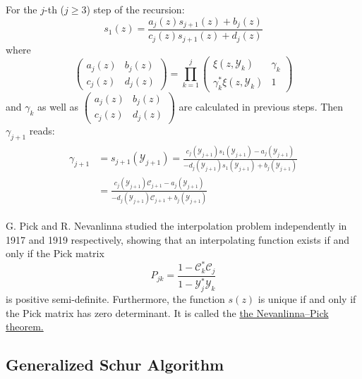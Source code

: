 \documentclass[
	preprint,%
	aps,
	prb,
	showpacs,	
	amsmath, amssymb]{revtex4-2}
\newcommand{\Y}{ {\mathcal{Y}} }
\newcommand{\C}{ {\mathcal{C}} }
\begin{document}
For the $j$-th ($j \geq 3$) step of the recursion:
\begin{equation}
	s_1(z) 
	= \frac{a_j(z) s_{j+1}(z) + b_j(z)}{c_j(z) s_{j+1}(z) + d_j(z)}
\end{equation}
where
\begin{equation}
	\left(
		\begin{matrix}
			a_j(z) & b_j(z) \\
			c_j(z) & d_j(z)
		\end{matrix}
	\right)
	= \prod_{k=1}^{j}
	\left(
		\begin{matrix}
			\xi(z, \Y_k)            & \gamma_k \\
			\gamma_k^* \xi(z, \Y_k) & 1
		\end{matrix}
	\right)
\end{equation}
and $\gamma_k$ as well as $	\left(
	\begin{matrix}
		a_j(z) & b_j(z) \\
		c_j(z) & d_j(z)
	\end{matrix}
\right)$ are calculated in previous steps. 
Then $\gamma_{j+1}$ reads:
\begin{align}
\begin{split}
	\gamma_{j+1} &= s_{j+1}(\Y_{j+1}) 
	= \frac{c_j(\Y_{j+1}) s_1(\Y_{j+1}) - a_j(\Y_{j+1})}
	{-d_j(\Y_{j+1}) s_1(\Y_{j+1}) + b_j(\Y_{j+1})} \\
	&= \frac{c_j(\Y_{j+1}) \C_{j+1} - a_j(\Y_{j+1})}
	{-d_j(\Y_{j+1}) \C_{j+1} + b_j(\Y_{j+1})}
\end{split}
\end{align}


G. Pick and R. Nevanlinna studied the interpolation problem 
independently in 1917\cite{Pick1917} and 1919\cite{nevanlinna1919uber} 
respectively, showing that an 
interpolating function exists if and only if the Pick matrix
\begin{equation}\label{eq:pick-matrix-origional}
	P_{jk} = \frac{1-\C_k^* \C_j}{1 - \Y_j^* \Y_k}
\end{equation}
is positive semi-definite. Furthermore, the function $s(z)$ is 
unique if and only if the Pick matrix has zero determinant. It 
is called the 
\href{https://en.wikipedia.org/wiki/Nevanlinna%E2%80%93Pick_interpolation}
	{the Nevanlinna–Pick theorem.}


\subsection{Generalized Schur Algorithm}
\label{subsec:generalized-schur-algorithm}
\end{document}
